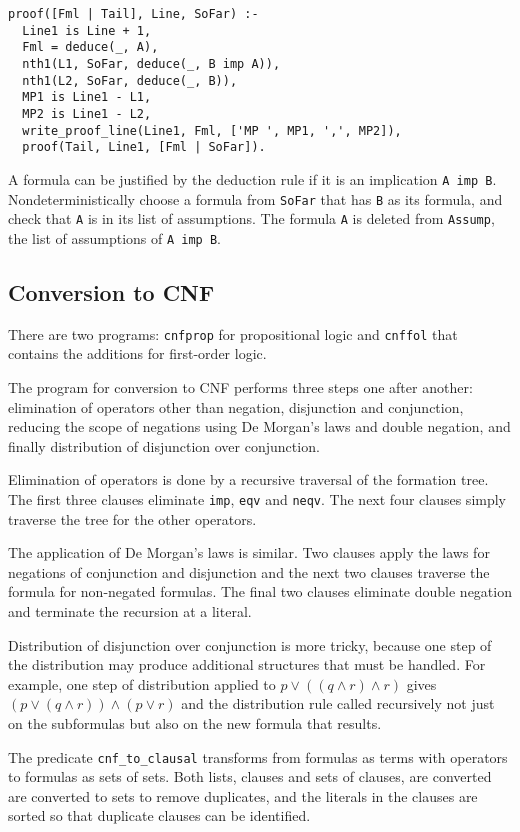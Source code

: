 \documentclass[11pt]{article}
\newcommand*{\p}[1]{\textup{\texttt{#1}}}
\begin{document}
\begin{verbatim}
proof([Fml | Tail], Line, SoFar) :- 
  Line1 is Line + 1,
  Fml = deduce(_, A),
  nth1(L1, SoFar, deduce(_, B imp A)), 
  nth1(L2, SoFar, deduce(_, B)),
  MP1 is Line1 - L1,
  MP2 is Line1 - L2,
  write_proof_line(Line1, Fml, ['MP ', MP1, ',', MP2]),
  proof(Tail, Line1, [Fml | SoFar]).
\end{verbatim}

A formula can be justified by the deduction rule if it is an implication
\p{A imp B}. Nondeterministically choose a formula from \p{SoFar} that
has \p{B} as its formula, and check that \p{A} is in its list of
assumptions. The formula \p{A} is deleted from \p{Assump}, the list of
assumptions of \p{A imp B}.



\subsection{Conversion to CNF}\label{s.cnf}

There are two programs: \p{cnfprop} for propositional logic and
\p{cnffol} that contains the additions for first-order logic.

The program for conversion to CNF performs three steps one after
another: elimination of operators other than negation, disjunction and
conjunction, reducing the scope of negations using De Morgan's laws and
double negation, and finally distribution of disjunction over
conjunction.

Elimination of operators is done by a recursive traversal of the
formation tree. The first three clauses eliminate \p{imp}, \p{eqv} and
\p{neqv}. The next four clauses simply traverse the tree for the other
operators.

The application of De Morgan's laws is similar. Two clauses apply the
laws for negations of conjunction and disjunction and the next two
clauses traverse the formula for non-negated formulas. The final two
clauses eliminate double negation and terminate the recursion at a
literal.

Distribution of disjunction over conjunction is more tricky, because one
step of the distribution may produce additional structures that must be
handled. For example, one step of distribution applied to $p \vee
((q\wedge r) \wedge r)$ gives $(p \vee (q\wedge r)) \wedge (p \vee r)$
and the distribution rule called recursively not just on the subformulas
but also on the new formula that results.

The predicate \p{cnf\_to\_clausal} transforms from formulas as terms
with operators to formulas as sets of sets. Both lists, clauses and
sets of clauses, are converted are converted to sets to remove
duplicates, and the literals in the clauses are sorted so that duplicate
clauses can be identified.
\end{document}
